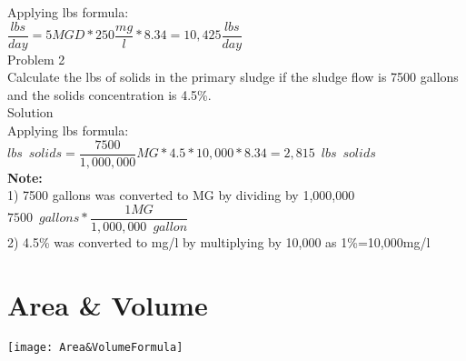 Applying lbs formula:\\
$\dfrac{lbs}{day}=5 MGD *250\dfrac{mg}{l}*8.34 = \boxed{10,425\dfrac{lbs}{day}}$
\\
\vspace{6pt}
Problem 2\\Calculate the lbs of solids in the primary sludge if the sludge flow is 7500 gallons and the solids concentration is 4.5\%.\\
Solution\\
Applying lbs formula:\\
$lbs \enspace solids = \dfrac{7500}{1,000,000}MG * 4.5*10,000 *8.34 = \boxed{2,815 \enspace lbs \enspace solids}$\\
\textbf{Note:}\\  
1) 7500 gallons was converted to MG by dividing by 1,000,000\\
$7500 \enspace gallons * \dfrac{1 MG}{1,000,000 \enspace gallon}$\\
2) 4.5\% was converted to mg/l by multiplying by 10,000 as 1\%=10,000mg/l


\section{Area \& Volume}


\begin{center}
\texttt{[image: Area\&VolumeFormula]}
\end{center}
